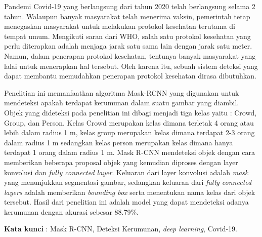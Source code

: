 \begin{spacing}{1}
	
Pandemi Covid-19 yang berlangsung dari tahun 2020 telah berlangsung selama 2 tahun. Walaupun
banyak masyarakat telah menerima vaksin, pemerintah tetap menegaskan masyarakat untuk melakukan protokol kesehatan
terutama di tempat umum.
Mengikuti saran dari WHO, salah satu protokol kesehatan yang perlu diterapkan adalah menjaga jarak satu sama lain
dengan jarak satu meter.
Namun, dalam penerapan protokol kesehatan, tentunya banyak masyarakat yang lalai untuk menerapkan hal tersebut.
Oleh karena itu, sebuah sistem deteksi yang dapat membantu memudahkan penerapan protokol kesehatan dirasa dibutuhkan.

Penelitian ini memanfaatkan algoritma Mask-RCNN yang digunakan untuk mendeteksi apakah terdapat kerumunan dalam suatu gambar yang diambil.
Objek yang dideteksi pada penelitian ini dibagi menjadi tiga kelas yaitu : Crowd, Group, dan Person. Kelas Crowd merupakan
kelas dimana terletak 4 orang atau lebih dalam radius 1 m, kelas group merupakan kelas dimana terdapat 2-3 orang dalam radius
1 m sedangkan kelas person merupakan kelas dimana hanya terdapat 1 orang dalam radius 1 m.
Mask R-CNN mendeteksi objek dengan cara memberikan beberapa proposal objek yang kemudian diproses dengan layer konvolusi dan \emph{fully connected layer}.
Keluaran dari layer konvolusi adalah \emph{mask} yang menunjukkan segmentasi gambar, sedangkan keluaran dari \emph{fully connected layers} adalah memberikan \emph{bounding box} serta menentukan nama kelas dari objek tersebut.
Hasil dari penelitian ini adalah model yang dapat mendeteksi adanya kerumunan dengan akurasi sebesar 88.79\%.

\vspace{2ex}
\textbf{Kata kunci }: Mask R-CNN, Deteksi Kerumunan, \emph{deep learning}, Covid-19.
	
\end{spacing}